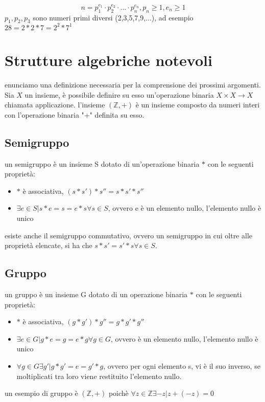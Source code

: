 \documentclass{article}
\begin{document}
        \begin{equation}
            n=p_1^{e_1}\cdot p_2^{e_2}\cdot ...\cdot p_n^{e_n}, p_n\geq 1,e_n\geq 1
        \end{equation}
        $p_1,p_2,p_3$ sono numeri primi diversi (2,3,5,7,9,...), ad esempio $28=2*2*7=2^2*7^1$

\section{Strutture algebriche notevoli}
    enunciamo una definizione necessaria per la comprensione dei prossimi argomenti. Sia $X$ un insieme, è possibile definire su esso un'operazione binaria $X\times X \rightarrow X$ chiamata applicazione. l'insieme $(\mathbb{Z},+)$ è un insieme composto da numeri interi con l'operazione binaria "+" definita su esso.

    \subsection{Semigruppo}
        un semigruppo è un insieme S dotato di un'operazione binaria $\ast$ con le seguenti proprietà:

        \begin{itemize}
            \item $\ast$ è associativa, $(s\ast s')\ast s''= s\ast s'\ast s''$
            \item $\exists e\in S | s\ast e = s = e\ast s\forall s \in S$, ovvero e è un elemento nullo, l'elemento nullo è unico
        \end{itemize}
        esiste anche il semigruppo commutativo, ovvero un semigruppo in cui oltre alle proprietà elencate, si ha che $s\ast s'= s' \ast s\forall s \in S$.

    \subsection{Gruppo}
        un gruppo è un insieme G dotato di un operazione binaria $\ast$ con le seguenti proprietà:

        \begin{itemize}
            \item $\ast$ è associativa, $(g\ast g')\ast g''= g\ast g'\ast g''$
            \item $\exists e\in G | g\ast e = g = e\ast g \forall g \in G$, ovvero è un elemento nullo, l'elemento nullo è unico
            \item $\forall g \in G \exists g' |g\ast g'=e=g'\ast g$, ovvero per ogni elemento s, vi è  il suo inverso, se moltiplicati tra loro viene restituito l'elemento nullo.
        \end{itemize}
%
        un esempio di gruppo è $(\mathbb{Z},+)$ poichè $\forall z \in \mathbb{Z}\exists -z|z+(-z)=0$
\end{document}
